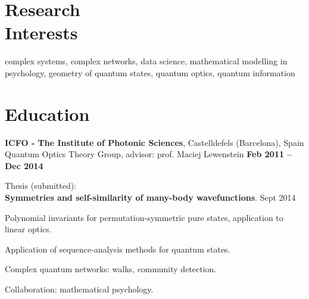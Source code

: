 \documentclass[margin,line]{resume}
\begin{document}
\begin{resume}
\vspace{3mm}

    \section{\mysidestyle Research\\Interests}
    complex systems, complex networks, data science, mathematical modelling in psychology,
    geometry of quantum states, quantum optics, quantum information

\vspace{3mm}

    \section{\mysidestyle Education}
    
    {\bf ICFO - The Institute of Photonic Sciences},  Castelldefels (Barcelona), Spain \\%
    Quantum Optics Theory Group, advisor: prof. Maciej Lewenstein \hfill {\bf Feb 2011 -- Dec 2014}\\
   \begin{list2}
        \vspace*{-4mm}
        \item Thesis (submitted):\\
            \textbf{Symmetries and self-similarity of many-body wavefunctions}. \hfill {Sept 2014}
        \item Polynomial invariants for permutation-symmetric pure states, application to linear optics.
        \item Application of sequence-analysis methods for quantum states.
        \item Complex quantum networks: walks, community detection.
        \item Collaboration: mathematical psychology.
    \end{list2}


\end{resume}
\end{document}

